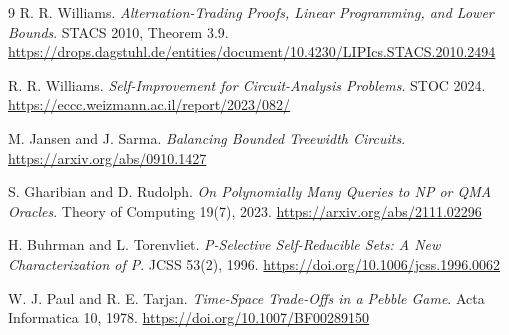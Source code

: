 \documentclass[11pt]{article}
\begin{document}
\begin{thebibliography}{9}
 R. R. Williams.
\emph{Alternation-Trading Proofs, Linear Programming, and Lower Bounds}.
STACS 2010, Theorem 3.9.
\url{https://drops.dagstuhl.de/entities/document/10.4230/LIPIcs.STACS.2010.2494}

 R. R. Williams.
\emph{Self-Improvement for Circuit-Analysis Problems}.
STOC 2024.
\url{https://eccc.weizmann.ac.il/report/2023/082/}

 M. Jansen and J. Sarma.
\emph{Balancing Bounded Treewidth Circuits}.
\url{https://arxiv.org/abs/0910.1427}

 S. Gharibian and D. Rudolph.
\emph{On Polynomially Many Queries to NP or QMA Oracles}.
Theory of Computing 19(7), 2023.
\url{https://arxiv.org/abs/2111.02296}

 H. Buhrman and L. Torenvliet.
\emph{P-Selective Self-Reducible Sets: A New Characterization of P}.
JCSS 53(2), 1996.
\url{https://doi.org/10.1006/jcss.1996.0062}

 W. J. Paul and R. E. Tarjan.
\emph{Time-Space Trade-Offs in a Pebble Game}.
Acta Informatica 10, 1978.
\url{https://doi.org/10.1007/BF00289150}
\end{thebibliography}

\end{document}
